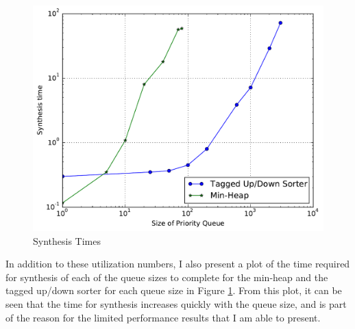 \begin{figure}[t!]
	\centering
	\includegraphics[width=\columnwidth]{data/synthesis_times.pdf}
	\caption{Synthesis Times}
	\label{fig:synth_times}
\end{figure}

In addition to these utilization numbers, I also present a plot of the time required for synthesis of each of the queue sizes to complete for the min-heap and the tagged up/down sorter for each queue size in Figure \ref{fig:synth_times}. From this plot, it can be seen that the time for synthesis increases quickly with the queue size, and is part of the reason for the limited performance results that I am able to present.
